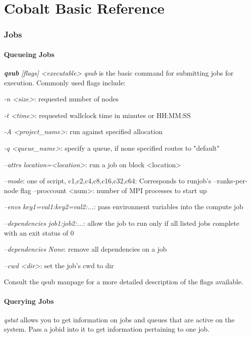 \documentclass[12pt,letterpaper]{article}
\begin{document}
\part*{Cobalt Basic Reference}
\section*{Jobs}
\subsection*{Queueing Jobs}
\textit{\textbf{qsub} [flags] \textless executable\textgreater {}}
\textit{qsub} is the basic command for submitting jobs for execution.  Commonly used flags include:
\begin{list}{}{}
\item \textit{-n \textless size\textgreater}: requested number of nodes
\item \textit{-t \textless time\textgreater}: requested wallclock time in minutes or HH:MM:SS
\item \textit{-A \textless project\_name\textgreater}:  run against specified allocation
\item \textit{-q \textless queue\_name\textgreater}: specify a queue, if none specified routes to "default"
\item \textit{--attrs location=\textless location\textgreater}: run a job on block \textless location\textgreater
\item \textit{--mode}: one of script, c1,c2,c4,c8,c16,c32,c64:
    Corresponds to runjob's --ranks-per-node flag
--proccount \textless num\textgreater : number of MPI processes to start up
\item \textit{--envs key1=val1:key2=val2:...}: pass environment variables into the compute job
\item \textit{--dependencies job1:job2:...}: allow the job to run only if all listed 
    jobs complete with an exit status of 0
\item \textit{--dependencies None}: remove all dependencies on a job
\item \textit{--cwd \textless dir\textgreater}: set the job's cwd to dir
\end{list}

Consult the qsub manpage for a more detailed description of the flags available.

\subsection*{Querying Jobs}
\textit{qstat} allows you to get information on jobs and queues that are active on the system. Pass a jobid into it to get information pertaining to one job.
\end{document}
